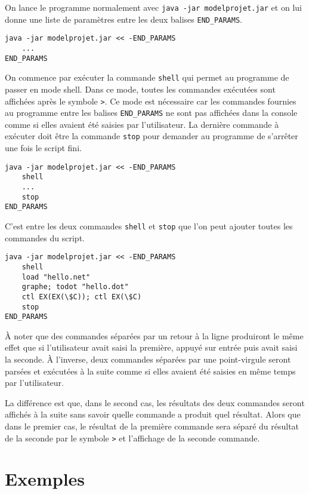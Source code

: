 \documentclass[dvipsnames]{report}
\begin{document}
On lance le programme normalement avec \texttt{java -jar modelprojet.jar} et on lui donne une liste de paramètres entre les deux balises \texttt{END\_PARAMS}.
\begin{verbatim}
java -jar modelprojet.jar << -END_PARAMS
    ...
END_PARAMS
\end{verbatim}

On commence par exécuter la commande \texttt{shell} qui permet au programme de passer en mode shell. Dans ce mode, toutes les commandes exécutées sont affichées après le symbole \texttt{>}. Ce mode est nécessaire car les commandes fournies au programme entre les balises \texttt{END\_PARAMS} ne sont pas affichées dans la console comme si elles avaient été saisies par l'utilisateur. La dernière commande à exécuter doit être la commande \texttt{stop} pour demander au programme de s'arrêter une fois le script fini.

\begin{verbatim}
java -jar modelprojet.jar << -END_PARAMS
    shell
    ...
    stop
END_PARAMS
\end{verbatim}

C'est entre les deux commandes \texttt{shell} et \texttt{stop} que l'on peut ajouter toutes les commandes du script.

\begin{verbatim}
java -jar modelprojet.jar << -END_PARAMS
    shell
    load "hello.net"
    graphe; todot "hello.dot"
    ctl EX(EX(\$C)); ctl EX(\$C)
    stop
END_PARAMS
\end{verbatim}

\`{A} noter que des commandes séparées par un retour à la ligne produiront le même effet que si l'utilisateur avait saisi la première, appuyé sur entrée puis avait saisi la seconde. \`{A} l'inverse, deux commandes séparées par une point-virgule seront parsées et exécutées à la suite comme si elles avaient été saisies en même temps par l'utilisateur.

La différence est que, dans le second cas, les résultats des deux commandes seront affichés à la suite sans savoir quelle commande a produit quel résultat. Alors que dans le premier cas, le résultat de la première commande sera séparé du résultat de la seconde par le symbole \texttt{>} et l'affichage de la seconde commande.

\section{Exemples}
\end{document}
